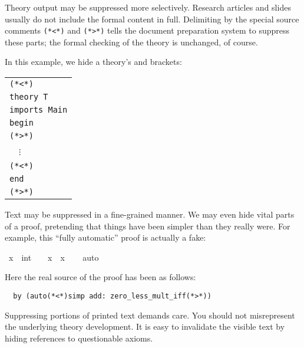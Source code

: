 \begin{isabellebody}
\begin{isamarkuptext}
  \medskip Theory output may be suppressed more selectively.  Research
  articles and slides usually do not include the formal content in
  full.  Delimiting  by the special source
  comments \verb,(,\verb,*,\verb,<,\verb,*,\verb,), and
  \verb,(,\verb,*,\verb,>,\verb,*,\verb,), tells the document
  preparation system to suppress these parts; the formal checking of
  the theory is unchanged, of course.

  In this example, we hide a theory's  and
   brackets:

  \medskip

  \begin{tabular}{l}
  \verb,(,\verb,*,\verb,<,\verb,*,\verb,), \\
  \texttt{theory T} \\
  \texttt{imports Main} \\
  \texttt{begin} \\
  \verb,(,\verb,*,\verb,>,\verb,*,\verb,), \\
  ~~$\vdots$ \\
  \verb,(,\verb,*,\verb,<,\verb,*,\verb,), \\
  \texttt{end} \\
  \verb,(,\verb,*,\verb,>,\verb,*,\verb,), \\
  \end{tabular}

  \medskip

  Text may be suppressed in a fine-grained manner.  We may even hide
  vital parts of a proof, pretending that things have been simpler
  than they really were.  For example, this ``fully automatic'' proof
  is actually a fake:%
\end{isamarkuptext}%
\isamarkuptrue%
\ {\isachardoublequote}x\ {\isasymnoteq}\ {\isacharparenleft}{}{\isacharcolon}{\isacharcolon}int{\isacharparenright}\ {\isasymLongrightarrow}\ {}\ {\isacharless}\ x\ {\isacharasterisk}\ x{\isachardoublequote}\isanewline
\ \ \isamarkupfalse%
\ {\isacharparenleft}auto{\isacharparenright}\isamarkupfalse%
%
\begin{isamarkuptext}%
\noindent Here the real source of the proof has been as follows:

\begin{verbatim}
  by (auto(*<*)simp add: zero_less_mult_iff(*>*))
\end{verbatim}

  \medskip Suppressing portions of printed text demands care.  You
  should not misrepresent the underlying theory development.  It is
  easy to invalidate the visible text by hiding references to
  questionable axioms.


\end{isamarkuptext}
\end{isabellebody}
